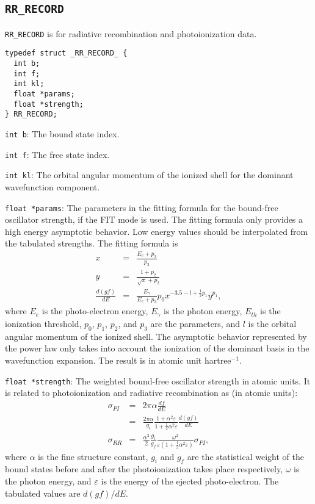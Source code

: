 \subsection{\texttt{RR\_RECORD}}
\texttt{RR\_RECORD} is for radiative recombination and photoionization data.

\begin{verbatim}
typedef struct _RR_RECORD_ {
  int b;
  int f;
  int kl;
  float *params;
  float *strength;
} RR_RECORD;
\end{verbatim}

\begin{dbdesc}
\item[\texttt{int b}:] The bound state index.
\item[\texttt{int f}:] The free state index.
\item[\texttt{int kl}:] The orbital angular momentum of the ionized shell for
the dominant wavefunction component.
\item[\texttt{float *params}:] The parameters in the fitting formula for the
bound-free oscillator strength, if the FIT mode is
used. The fitting formula only provides a high energy asymptotic behavior. Low
energy values should be interpolated from the tabulated strengths. The fitting
formula is
\begin{eqnarray}
x &=& \frac{E_e+p_3}{p_3} \nonumber\\
y &=& \frac{1+p_2}{\sqrt{x}+p_2} \nonumber\\
\frac{d(gf)}{dE} &=&
\frac{E_\gamma}{E_e+p_3}p_0x^{-3.5-l+\frac{1}{2}p_1}y^{p_1}, 
\end{eqnarray}
where $E_e$ is the photo-electron energy, $E_\gamma$ is the photon energy,
$E_{th}$ is the ionization threshold, $p_0$, $p_1$, $p_2$, and $p_3$ are the
parameters, and $l$ is the orbital angular momentum of the ionized
shell. The asymptotic behavior represented by the power law only takes into
account the ionization of the dominant basis in the wavefunction
expansion. The result is in atomic unit hartree$^{-1}$.
\item[\texttt{float *strength}:] The weighted bound-free oscillator strength in
atomic units. It is related to photoionization and radiative recombination as
(in atomic units):
\begin{eqnarray}
\sigma_{PI} &=& 2\pi\alpha\frac{d f}{d E} \nonumber\\
            &=& \frac{2\pi\alpha}{g_i}
		 \frac{1+\alpha^2\varepsilon}{1+\frac{1}{2}\alpha^2 \varepsilon}
		 \frac{d(gf)}{d E} \nonumber\\
\sigma_{RR} &=& \frac{\alpha^2}{2}\frac{g_i}{g_f}
                \frac{\omega^2}{\varepsilon \left(1+\frac{1}{2}\alpha^2
                  \varepsilon\right)} \sigma_{PI},
\end{eqnarray}
where $\alpha$ is the fine structure constant, $g_i$ and $g_f$ are the
statistical weight of the bound states before and after the photoionization
takes place respectively, $\omega$ is the photon energy, and $\varepsilon$ is
the energy of the ejected photo-electron. The tabulated values are $d(gf)/dE$.
\end{dbdesc}

